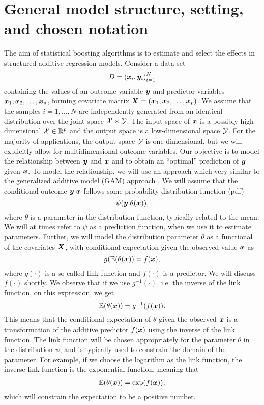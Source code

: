 \section{General model structure, setting, and chosen notation} %
The aim of statistical boosting algorithms is to estimate and select the effects in structured additive regression models.
Consider a data set
\begin{equation*}
    D=\left(\bm{x}_i,\bm{y}_i\right)_{i=1}^N
\end{equation*}
containing the values of an outcome variable $\bm{y}$ and predictor variables $\bm{x}_1, \bm{x}_2,\ldots,\bm{x}_p$, forming covariate matrix $\bm{X}=(\bm{x}_1, \bm{x}_2,\ldots,\bm{x}_p)$.
We assume that the samples $i=1,\ldots,N$ are independently generated from an identical distribution over the joint space $\mathcal{X}\times\mathcal{Y}$.
The input space of $\bm{x}$ is a possibly high-dimensional $\mathcal{X}\in\mathbb{R}^p$ and the output space is a low-dimensional space $\mathcal{Y}$.
For the majority of applications, the output space $\mathcal{Y}$ is one-dimensional, but we will explicitly allow for multidimensional outcome variables.
Our objective is to model the relationship between $\bm{y}$ and $\bm{x}$ and to obtain an ``optimal'' prediction of $\bm{y}$ given $\bm{x}$.
To model the relationship, we will use an approach which very similar to the generalized additive model (GAM) approach \citep{gam-book}.
We will assume that the conditional outcome $\bm{y}|\bm{x}$ follows some probability distribution function (pdf)
\begin{equation}\label{eq:psi}
    \psi(\bm{y}|\theta(\bm{x})),
\end{equation}
where $\theta$ is a parameter in the distribution function, typically related to the mean. We will at times refer to $\psi$ as a prediction function, when we use it to estimate parameters.
Further, we will model the distribution parameter $\theta$ as a functional of the covariates $\bm{X}$, with conditional expectation given the observed value $\bm{x}$ as
\begin{equation}
    g(\mathbb{E}(\theta(\bm{x}))=f(\bm{x}),
\end{equation}
where $g(\cdot)$ is a so-called link function and $f(\cdot)$ is a predictor.
We will discuss $f(\cdot)$ shortly.
We observe that if we use $g^{-1}(\cdot)$, i.e. the inverse of the link function, on this expression, we get
\begin{equation*}
    \mathbb{E}(\theta(\bm{x}))=g^{-1}(f(\bm{x})).
\end{equation*}
This means that the conditional expectation of $\theta$ given the observed $\bm{x}$ is a transformation of the additive predictor $f(\bm{x})$ using the inverse of the link function.
The link function will be chosen appropriately for the parameter $\theta$ in the distribution $\psi$, and is typically used to constrain the domain of the parameter.
For example, if we choose the logarithm as the link function, the inverse link function is the exponential function, meaning that
\begin{align}
    \mathbb{E}(\theta(\bm{x}))=\exp(f(\bm{x})),
\end{align}
which will constrain the expectation to be a positive number.

